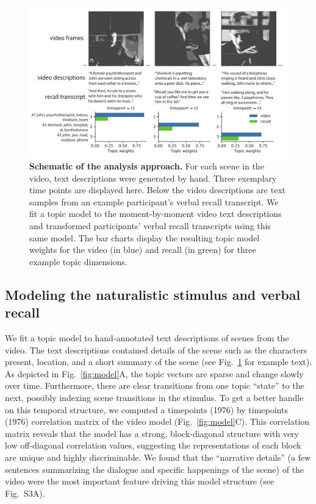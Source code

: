 \documentclass{article}
\begin{document}
\begin{figure}[tp]
\centering
\includegraphics[width=1\textwidth]{figs/1_analysis_schematic_bw.pdf}
\caption{\small \textbf{Schematic of the analysis approach.} For each scene in the video, text descriptions were generated by hand. Three exemplary time points are displayed here.  Below the video descriptions are text samples from an example participant's verbal recall transcript.  We fit a topic model to the moment-by-moment video text descriptions and transformed participants' verbal recall transcripts using this same model. The bar charts display the resulting topic model weights for the video (in blue) and recall (in green) for three example topic dimensions.}
\label{fig:schematic}
\end{figure}

\subsection*{Modeling the naturalistic stimulus and verbal recall}
We fit a topic model \citep{BleiEtal03} to hand-annotated text descriptions of scenes from the video. The text descriptions contained details of the scene such as the characters present, location, and a short summary of the scene (see Fig.~\ref{fig:schematic} for example text). As depicted in Fig.~\ref{fig:model}A, the topic vectors are sparse and change slowly over time. Furthermore, there are clear transitions from one topic ``state'' to the next, possibly indexing scene transitions in the stimulus. To get a better handle on this temporal structure, we computed a timepoints (1976) by timepoints (1976) correlation matrix of the video model (Fig.~\ref{fig:model}C).  This correlation matrix reveals that the model has a strong, block-diagonal structure with very low off-diagonal correlation values, suggesting the representations of each block are unique and highly discriminable. We found that the ``narrative details'' (a few sentences summarizing the dialogue and specific happenings of the scene) of the video were the most important feature driving this model structure (see Fig.~S3A).
\end{document}
